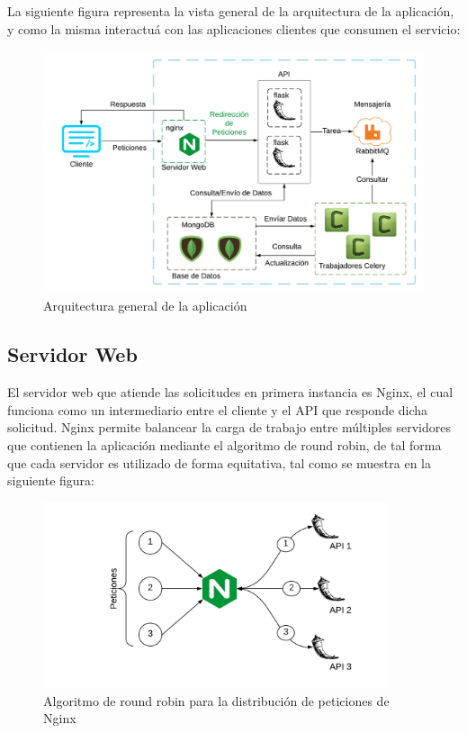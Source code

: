 La siguiente figura representa la vista general de la arquitectura de la aplicación, y como la misma interactuá con
las aplicaciones clientes que consumen el servicio:

\begin{figure}[H]
	\centering
		\includegraphics[width=1\textwidth]{figures/diagram_general}
	\caption{Arquitectura general de la aplicación}
	\label{fig:diagram_general}

\end{figure}

\subsection{Servidor Web}

El servidor web que atiende las solicitudes en primera instancia es Nginx,
el cual funciona como un intermediario entre el cliente y el API que responde dicha solicitud.
Nginx permite balancear la carga de trabajo entre múltiples servidores que contienen la aplicación mediante el algoritmo de round robin,
de tal forma que cada servidor es utilizado de forma equitativa, tal como se muestra en la siguiente figura:

\begin{figure}[H]
	\centering
		\includegraphics[width=0.9\textwidth]{figures/round_robin}
	\caption{Algoritmo de round robin para la distribución de peticiones de Nginx}
	\label{fig:round_robin}
\end{figure}

